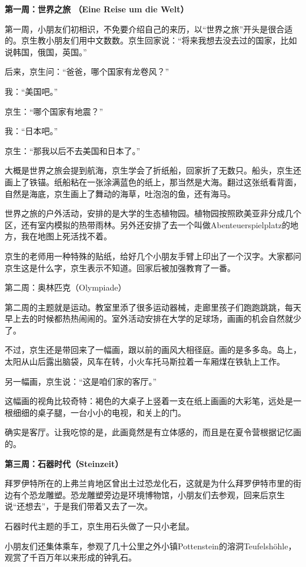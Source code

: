 \documentclass[twoside,openright,headings=optiontohead]{ctexbook} %
\begin{document}
{\textbf{第一周：世界之旅 （Eine Reise um die Welt）}

第一周，小朋友们初相识，不免要介绍自己的来历，以``世界之旅''开头是很合适的。京生教小朋友们用中文数数。京生回家说：``将来我想去没去过的国家，比如说韩国，俄国，英国。''

后来，京生问：``爸爸，哪个国家有龙卷风？''

我：``美国吧。''

京生：``哪个国家有地震？''

我：``日本吧。''

京生：``那我以后不去美国和日本了。''

大概是世界之旅会提到航海，京生学会了折纸船，回家折了无数只。船头，京生还画上了铁锚。纸船粘在一张涂满蓝色的纸上，那当然是大海。翻过这张纸看背面，自然是海底，京生画上了舞动的海草，吐泡泡的鱼，还有海马。

世界之旅的户外活动，安排的是大学的生态植物园。植物园按照欧美亚非分成几个区，还有室内模拟的热带雨林。另外还安排了去一个叫做Abenteuerspielplatz的地方，我在地图上死活找不着。

京生的老师用一种特殊的贴纸，给好几个小朋友手臂上印出了一个汉字。大家都问京生这是什么字，京生表示不知道。回家后被加强教育了一番。

第二周：奥林匹克（Olympiade）

第二周的主题就是运动。教室里添了很多运动器械，走廊里孩子们跑跑跳跳，每天早上去的时候都热热闹闹的。室外活动安排在大学的足球场，画画的机会自然就少了。

不过，京生还是带回来了一幅画，跟以前的画风大相径庭。画的是多多岛。岛上，太阳从山后露出脑袋，风车在转，小火车托马斯拉着一车厢煤在铁轨上工作。

另一幅画，京生说：``这是咱们家的客厅。''

这幅画的视角比较奇特：褐色的大桌子上竖着一支在纸上画画的大彩笔，远处是一根细细的桌子腿，一台小小的电视，和关上的门。

确实是客厅。让我吃惊的是，此画竟然是有立体感的，而且是在夏令营根据记忆画的。

\textbf{第三周：石器时代（Steinzeit）}

拜罗伊特所在的上弗兰肯地区曾出土过恐龙化石，这就是为什么拜罗伊特市里的街边有个恐龙雕塑。恐龙雕塑旁边是环境博物馆，小朋友们去参观，回来后京生说``还想去''，于是我们带着又去了一次。

石器时代主题的手工，京生用石头做了一只小老鼠。

小朋友们还集体乘车，参观了几十公里之外小镇Pottenstein的溶洞Teufelshöhle，观赏了千百万年以来形成的钟乳石。

}
\end{document}
